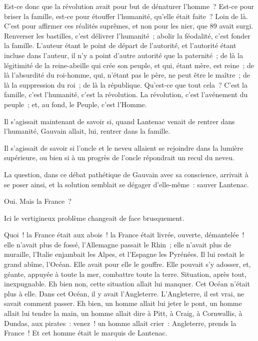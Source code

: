 \documentclass[french,twoside]{book} %
\begin{document}
Est-ce donc que la révolution avait pour but de dénaturer l’homme ? Est-ce pour briser la famille, est-ce pour étouffer l’humanité, qu’elle était faite ? Loin de là. C’est pour affirmer ces réalités suprêmes, et non pour les nier, que 89 avait surgi. Renverser les bastilles, c’est délivrer l’humanité ; abolir la féodalité, c’est fonder la famille. L’auteur étant le point de départ de l’autorité, et l’autorité étant incluse dans l’auteur, il n’y a point d’autre autorité que la paternité ; de là la légitimité de la reine-abeille qui crée son peuple, et qui, étant mère, est reine ; de là l’absurdité du roi-homme, qui, n’étant pas le père, ne peut être le maître ; de là la suppression du roi ; de là la république. Qu’est-ce que tout cela ? C’est la famille, c’est l’humanité, c’est la révolution. La révolution, c’est l’avénement du peuple ; et, au fond, le Peuple, c’est l’Homme.\par
Il s’agissait maintenant de savoir si, quand Lantenac venait de rentrer dans l’humanité, Gauvain allait, lui, rentrer dans la famille.\par
Il s’agissait de savoir si l’oncle et le neveu allaient se rejoindre dans la lumière supérieure, ou bien si à un progrès de l’oncle répondrait un recul du neveu.\par
 La question, dans ce débat pathétique de Gauvain avec sa conscience, arrivait à se poser ainsi, et la solution semblait se dégager d’elle-même : sauver Lantenac.\par
Oui. Mais la France ?\par
Ici le vertigineux problème changeait de face brusquement.\par
Quoi ! la France était aux abois ! la France était livrée, ouverte, démantelée ! elle n’avait plus de fossé, l’Allemagne passait le Rhin ; elle n’avait plus de muraille, l’Italie enjambait les Alpes, et l’Espagne les Pyrénées. Il lui restait le grand abîme, l’Océan. Elle avait pour elle le gouffre. Elle pouvait s’y adosser, et, géante, appuyée à toute la mer, combattre toute la terre. Situation, après tout, inexpugnable. Eh bien non, cette situation allait lui manquer. Cet Océan n’était plus à elle. Dans cet Océan, il y avait l’Angleterre. L’Angleterre, il est vrai, ne savait comment passer. Eh bien, un homme allait lui jeter le pont, un homme allait lui tendre la main, un homme allait dire à Pitt, à Craig, à Cornwallis, à Dundas, aux pirates : venez ! un homme allait crier : Angleterre, prends la France ! Et cet homme était le marquis de Lantenac.\par
\end{document}
